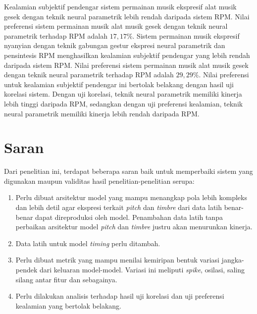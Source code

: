 Kealamian subjektif pendengar sistem permainan musik ekspresif alat musik gesek dengan teknik neural parametrik lebih rendah daripada sistem RPM. Nilai preferensi sistem permainan musik alat musik gesek dengan teknik neural parametrik terhadap RPM adalah $17,17\%$. %
Sistem permainan musik ekspresif nyanyian dengan teknik gabungan gestur ekspresi neural parametrik dan pensintesis RPM menghasilkan kealamian subjektif pendengar yang lebih rendah daripada sistem RPM. Nilai preferensi sistem permainan musik alat musik gesek dengan teknik neural parametrik terhadap RPM adalah $29,29\%$. %
Nilai preferensi untuk kealamian subjektif pendengar ini bertolak belakang dengan hasil uji korelasi sistem. Dengan uji korelasi, teknik neural parametrik memiliki kinerja lebih tinggi daripada RPM, sedangkan dengan uji preferensi kealamian, teknik neural parametrik memiliki kinerja lebih rendah daripada RPM.

\section{Saran}

Dari penelitian ini, terdapat beberapa saran baik untuk memperbaiki sistem yang digunakan maupun validitas hasil penelitian-penelitian serupa:
\begin{enumerate}
	\item Perlu dibuat arsitektur model yang mampu menangkap pola lebih kompleks dan lebih detil agar ekspresi terkait \textit{pitch} dan \textit{timbre} dari data latih benar-benar dapat direproduksi oleh model. Penambahan data latih tanpa perbaikan arsitektur model \textit{pitch} dan \textit{timbre} justru akan menurunkan kinerja.
	\item Data latih untuk model \textit{timing} perlu ditambah.
	\item Perlu dibuat metrik yang mampu menilai kemiripan bentuk variasi jangka-pendek dari keluaran model-model. Variasi ini meliputi \textit{spike}, osilasi, saling silang antar fitur dan sebagainya.
	\item Perlu dilakukan analisis terhadap hasil uji korelasi dan uji preferensi kealamian yang bertolak belakang.
\end{enumerate}